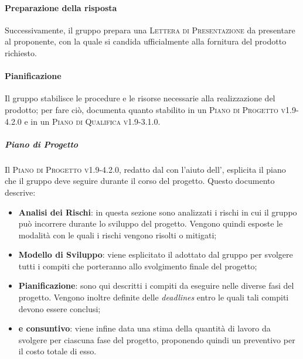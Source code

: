\documentclass[../norme-di-progetto.tex]{subfiles}
\begin{document}
\paragraph{Preparazione della risposta}
Successivamente, il gruppo prepara una \textsc{Lettera di Presentazione} da presentare al proponente, con la quale si candida ufficialmente alla fornitura del prodotto richiesto.

\paragraph{Pianificazione}
Il gruppo stabilisce le procedure e le risorse necessarie alla realizzazione del prodotto; per fare ciò, documenta quanto stabilito in un \textsc{Piano di Progetto v1.9-4.2.0} e in un \textsc{Piano di Qualifica v1.9-3.1.0}.

\subparagraph*{Piano di Progetto}
Il \textsc{Piano di Progetto v1.9-4.2.0}, redatto dal  con l'aiuto dell', esplicita il piano che il gruppo deve seguire durante il corso del progetto. Questo documento descrive:
\begin{itemize}
  \item \textbf{Analisi dei Rischi}: in questa sezione sono analizzati i rischi in cui il gruppo può incorrere durante lo sviluppo del progetto. Vengono quindi esposte le modalità con le quali i rischi vengono risolti o mitigati;
  \item \textbf{Modello di Sviluppo}: viene esplicitato il  adottato dal gruppo per svolgere tutti i compiti che porteranno allo svolgimento finale del progetto;
  \item \textbf{Pianificazione}: sono qui descritti i compiti da eseguire nelle diverse fasi del progetto. Vengono inoltre definite delle \textit{deadlines} entro le quali tali compiti devono essere conclusi;
  \item \textbf{ e consuntivo}: viene infine data una stima della quantità di lavoro da svolgere per ciascuna fase del progetto, proponendo quindi un preventivo per il costo totale di esso.
\end{itemize}
\end{document}
